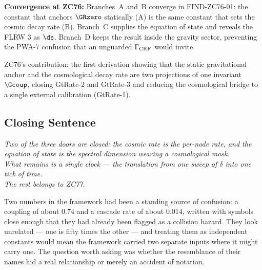 \documentclass[12pt, a4paper]{article}
\begin{document}
\begin{genealogybox}[title={How ZC76's Key Objects Trace Back}]
\textbf{Convergence at ZC76:}
Branches~A and~B converge in FIND-ZC76-01: the constant that anchors
$\GRzero$ statically (A) is the same constant that sets the cosmic decay
rate (B). Branch~C supplies the equation of state and reveals the FLRW
$3$ as $\ds$. Branch~D keeps the result inside the gravity sector,
preventing the PWA-7 confusion that an unguarded $\Gamma_{\rm CRF}$ would
invite.

ZC76's contribution: the first derivation showing that the static
gravitational anchor and the cosmological decay rate are two projections
of one invariant $\Gcoup$, closing GtRate-2 and GtRate-3 and reducing
the cosmological bridge to a single external calibration (GtRate-1).
\end{genealogybox}

\subsection{Closing Sentence}

\bigskip
\begin{center}
\textit{%
  Two of the three doors are closed: the cosmic rate is the per-node
  rate, and the equation of state is the spectral dimension wearing a
  cosmological mask.\\[0.3em]
  What remains is a single clock --- the translation from one sweep of
  $\delta$ into one tick of time.\\[0.3em]
  The rest belongs to ZC77.
}
\end{center}



\newpage

Two numbers in the framework had been a standing source of confusion: a
coupling of about $0.74$ and a cascade rate of about $0.014$, written with
symbols close enough that they had already been flagged as a collision hazard.
They look unrelated --- one is fifty times the other --- and treating them as
independent constants would mean the framework carried two separate inputs
where it might carry one. The question worth asking was whether the
resemblance of their names hid a real relationship or merely an accident of
notation.
\end{document}
